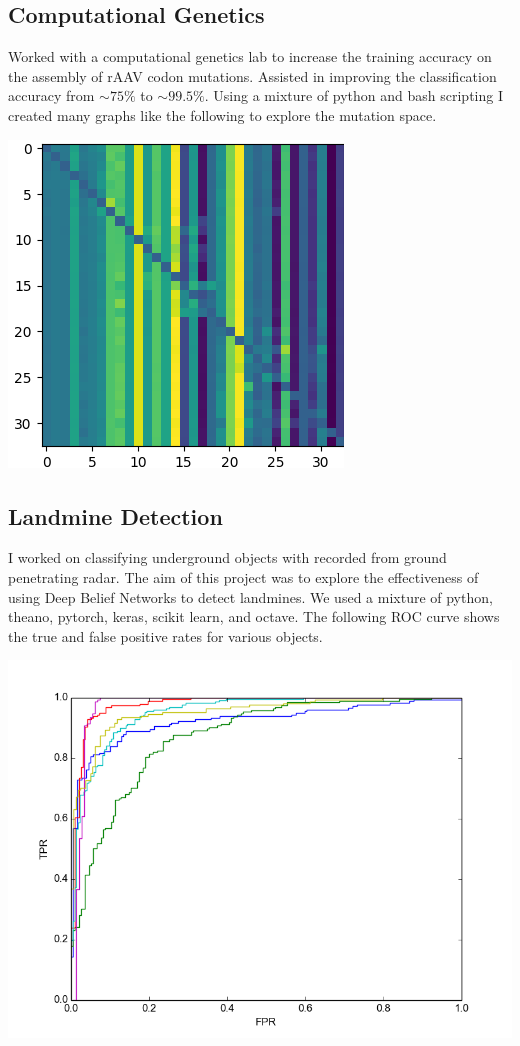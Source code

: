 \documentclass[../r.tex]{subfiles}
\begin{document}
\subsection{Computational Genetics}
Worked with a computational genetics lab to increase the training accuracy on the assembly of rAAV codon mutations.  Assisted in improving the classification accuracy from $\sim 75\%$ to $\sim 99.5\%$.  Using a mixture of python and bash scripting I created many graphs like the following to explore the mutation space.

\includegraphics[scale=0.5]{../research/sum_modes_RAmRU.png} 

\subsection{Landmine Detection}

I worked on classifying underground objects with recorded from ground penetrating radar.  The aim of this project was to explore the effectiveness of using Deep Belief Networks to detect landmines.  We used a mixture of python, theano, pytorch, keras, scikit learn, and octave.  The following ROC curve shows the true and false positive rates for various objects.

\includegraphics[scale=0.5]{../research/roc.png}
\end{document}
